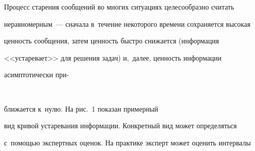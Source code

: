  


  Процесс старения сообщений во многих ситуациях целесообразно считать 


неравномерным~--- сначала в~течение некоторого времени сохраняется высокая


цен\-ность сообщения, затем цен\-ность быст\-ро снижается (информация 


<<устаревает>> для решения задач) и,~далее, цен\-ность информации 


асимп\-то\-ти\-че\-ски  при-\linebreak\vspace*{-12pt}





\pagebreak





\





\vspace*{-12pt}










\noindent 


бли\-жа\-ет\-ся к~нулю. На рис.~1 показан примерный 


вид кривой устаревания информации. Конкретный вид может определяться 


с~по\-мощью экспертных оценок. На практике эксперт может оценить интервалы 


